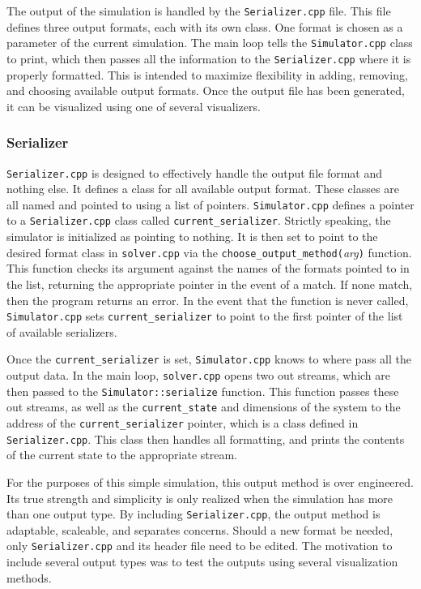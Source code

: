 \documentclass[a4paper,11pt]{article}
\begin{document}
The output of the simulation is handled by the \texttt{Serializer.cpp} file.  This file defines three output formats, each with its own class.  One format is chosen as a parameter of the current simulation.  The main loop tells the \texttt{Simulator.cpp} class to print, which then passes all the information to the \texttt{Serializer.cpp} where it is properly formatted.   This is intended to maximize flexibility in adding, removing, and choosing available output formats.  Once the output file has been generated, it can be visualized using one of several visualizers.

\subsubsection{Serializer}

\texttt{Serializer.cpp} is designed to effectively handle the output file format and nothing else.  It defines a class for all available output format.  These classes are all named and pointed to using a list of pointers.  \texttt{Simulator.cpp} defines a pointer to a \texttt{Serializer.cpp} class called \texttt{current\_serializer}.  Strictly speaking, the simulator is initialized as pointing to nothing.  It is then set to point to the desired format class in \texttt{solver.cpp} via the \texttt{choose\_output\_method(}\emph{arg}\texttt{)} function.  This function checks its argument against the names of the formats pointed to in the list, returning the appropriate pointer in the event of a match.  If none match, then the program returns an error.  In the event that the function is never called, \texttt{Simulator.cpp} sets \texttt{current\_serializer} to point to the first pointer of the list of available serializers.  

Once the  \texttt{current\_serializer} is set, \texttt{Simulator.cpp}  knows to where pass all the output data.  In the main loop, \texttt{solver.cpp}  opens two out streams, which are then passed to the \texttt{Simulator::serialize} function.  This function passes these out streams, as well as the \texttt{current\_state} and dimensions of the system to the address of the \texttt{current\_serializer} pointer, which is a class defined in \texttt{Serializer.cpp}.  This class then handles all formatting, and prints the contents of the current state to the appropriate stream.

For the purposes of this simple simulation, this output method is over engineered.  Its true strength and simplicity is only realized when the simulation has more than one output type.  By including \texttt{Serializer.cpp}, the output method is adaptable, scaleable, and separates concerns.  Should a new format be needed, only \texttt{Serializer.cpp} and its header file need to be edited.  The motivation to include several output types was to test the outputs using several visualization methods.
\end{document}
